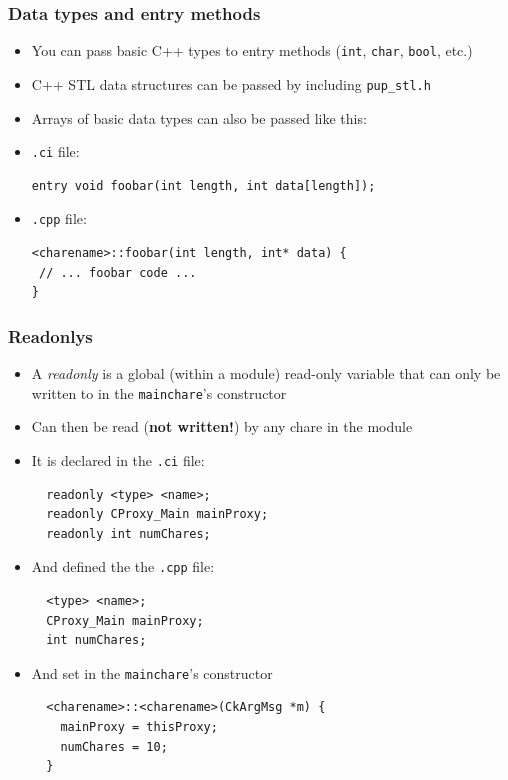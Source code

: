 \begin{frame}[fragile]
  \frametitle{Data types and entry methods}
\begin{itemize}
  \item You can pass basic C++ types to entry methods (\texttt{int},
    \texttt{char}, \texttt{bool}, etc.)
  \item C++ STL data structures can be passed by including \texttt{pup\_stl.h}
  \item Arrays of basic data types can also be passed like this:\\
  \item \texttt{.ci} file:
\begin{lstlisting}
entry void foobar(int length, int data[length]);
\end{lstlisting}
  \item \texttt{.cpp} file:
\begin{lstlisting}
<charename>::foobar(int length, int* data) {
 // ... foobar code ...
}
\end{lstlisting}
\end{itemize}
\end{frame}

\begin{frame}[fragile]
  \frametitle{Readonlys}
  \begin{itemize}
  \item A \textit{readonly} is a global (within a module) read-only variable
    that can only be written to in the \texttt{mainchare}'s constructor
  \item Can then be read (\textbf{not written!}) by any chare in the module
  \item It is declared in the \texttt{.ci} file:
  \begin{lstlisting}
  readonly <type> <name>;
  readonly CProxy_Main mainProxy;
  readonly int numChares;
  \end{lstlisting}
  \item And defined the the \texttt{.cpp} file:
  \begin{lstlisting}
  <type> <name>;
  CProxy_Main mainProxy;
  int numChares;
  \end{lstlisting}
  \item And set in the \texttt{mainchare}'s constructor
  \begin{lstlisting}
  <charename>::<charename>(CkArgMsg *m) {
    mainProxy = thisProxy;
    numChares = 10;
  }
\end{lstlisting}


\end{itemize}
\end{frame}

